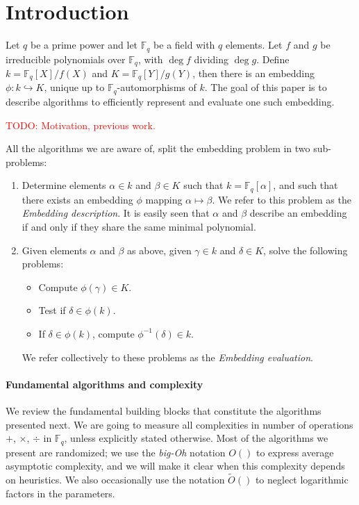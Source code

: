 \documentclass[12pt]{article}
\theoremstyle{plain}
\theoremstyle{definition}
\newcommand{\tildO}{\tilde{O}}
\newcommand{\todo}[1]{\textcolor{red}{TODO: #1}}
\def\F{\ensuremath{\mathbb{F}}}
\newcounter{algorithm}
\begin{document}
\section{Introduction}
\label{sec:introduction}

Let $q$ be a prime power and let $\F_q$ be a field with $q$
elements. Let $f$ and $g$ be irreducible polynomials over $\F_q$, with
$\deg f$ dividing $\deg g$. Define $k=\F_q[X]/f(X)$ and
$K=\F_q[Y]/g(Y)$, then there is an embedding $\phi:k\hookrightarrow
K$, unique up to $\F_q$-automorphisms of $k$. The goal of this paper
is to describe algorithms to efficiently represent and evaluate one
such embedding.

\todo{Motivation, previous work.}

All the algorithms we are aware of, split the embedding problem in two
sub-problems:
\begin{enumerate}
\item Determine elements $\alpha\in k$ and $\beta\in K$ such that
  $k=\F_q[\alpha]$, and such that there exists an
  embedding $\phi$ mapping $\alpha\mapsto\beta$. We refer to this
  problem as the \emph{Embedding description}.
  It is easily seen that $\alpha$ and $\beta$ describe an embedding
  if and only if they share the same minimal polynomial.
\item Given elements $\alpha$ and $\beta$ as above, given $\gamma\in
  k$ and $\delta\in K$, solve the following problems:
  \begin{itemize}
  \item Compute $\phi(\gamma)\in K$.
  \item Test if $\delta\in\phi(k)$.
  \item If $\delta\in\phi(k)$, compute $\phi^{-1}(\delta)\in k$.
  \end{itemize}
  We refer collectively to these problems as the \emph{Embedding
    evaluation}.
\end{enumerate}


\paragraph{Fundamental algorithms and complexity}
We review the fundamental building blocks that constitute the
algorithms presented next.  We are going to measure all complexities
in number of operations $+$, $\times$, $\div$ in $\F_q$, unless
explicitly stated otherwise. Most of the algorithms we present are
randomized; we use the \emph{big-Oh} notation $O()$ to express average
asymptotic complexity, and we will make it clear when this complexity
depends on heuristics. We also occasionally use the notation
$\tildO()$ to neglect logarithmic factors in the parameters.
\end{document}
